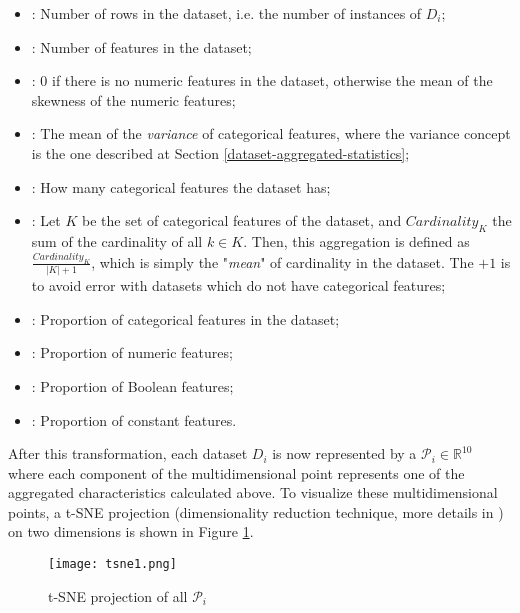 \begin{itemize}
    \item \textbf{}: Number of rows in the dataset, i.e. the number of instances of $D_i$;
    \item \textbf{}: Number of features in the dataset;
    \item \textbf{}: $0$ if there is no numeric features in the dataset, otherwise the mean of the skewness of the numeric features;
    \item \textbf{}: The mean of the \textit{variance} of categorical features, where the variance concept is the one described at Section \ref{dataset-aggregated-statistics};
    \item \textbf{}: How many categorical features the dataset has;
    \item \textbf{}: Let $K$ be the set of categorical features of the dataset, and $Cardinality_K$ the sum of the cardinality of all $k\in K$. Then, this aggregation is defined as $\frac{Cardinality_K}{|K| + 1}$, which is simply the "\textit{mean}" of cardinality in the dataset. The $+1$ is to avoid error with datasets which do not have categorical features;
    \item \textbf{}: Proportion of categorical features in the dataset;
    \item \textbf{}: Proportion of numeric features;
    \item \textbf{}: Proportion of Boolean features;
    \item \textbf{}: Proportion of constant features.
\end{itemize}


After this transformation, each dataset $D_i$ is now represented by a $\mathcal{P}_i \in \mathbb{R}^{10}$ where each component of the multidimensional point represents one of the aggregated characteristics calculated above. To visualize these multidimensional points, a t-SNE projection (dimensionality reduction technique, more details in \cite{maaten2008visualizing}) on two dimensions is shown in Figure \ref{fig:tsne-1}.

\begin{figure}[!h]
    \centering
    \texttt{[image: tsne1.png]}
    \caption{t-SNE projection of all $\mathcal{P}_i$}
    \label{fig:tsne-1}
\end{figure}


